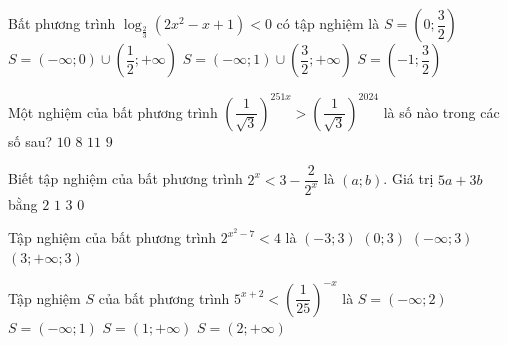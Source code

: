\begin{ex}%
	Bất phương trình  $\log_{\frac{2}{3}}\left(2x^2-x+1\right) < 0$ có tập nghiệm là
	\choice 
		 {$S=\left(0;\dfrac{3}{2}\right)$}
		{\True $S=\left(-\infty;0\right)\cup\left(\dfrac{1}{2};+\infty\right)$} 
		{$S=\left(-\infty;1\right)\cup\left(\dfrac{3}{2};+\infty\right)$} 
		{$S=\left(-1;\dfrac{3}{2}\right)$} 
\end{ex}

\begin{ex}%
	Một nghiệm của  bất phương trình $\left(\dfrac{1}{\sqrt{3}}\right)^{251x}>\left(\dfrac{1}{\sqrt{3}}\right)^{2024}$ là số nào trong các số sau?
	\choice 
		 {$10$}
		{\True $8$} 
		 {$11$}
		 {$9$}
\end{ex}

\begin{ex}%
	Biết tập nghiệm của bất  phương trình $2^x < 3-\dfrac{2}{2^x}$ là $\left(a; b\right)$. Giá trị $5a+3b$ bằng
	\choice 
		 {$2$}
		 {$1$}
		{\True $3$} 
		{$0$} 
\end{ex}

\begin{ex}%
	Tập nghiệm của  bất phương trình $2^{x^2-7} < 4$ là
	\choice 
		 {\True$(-3;3)$}
		{$(0;3)$} 
		{$(-\infty;3)$} 
		{$(3;  +\infty;3)$}
\end{ex}

\begin{ex}%
	Tập nghiệm $S$ của bất  phương trình $5^{x+2} < \left(\dfrac{1}{25} \right)^{-x}$ là
	\choice 
		 {$S=\left(-\infty;2\right)$}
		{$S=\left(-\infty;1\right)$} 
		{$S=\left(1;+\infty \right)$} 
		 {\True $S=\left(2;+\infty \right)$}
\end{ex}

